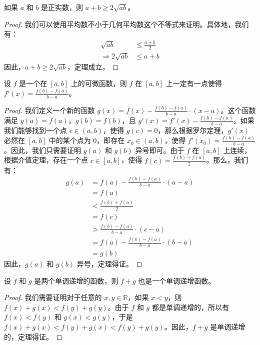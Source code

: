 \begin{cor}
  如果 $a$ 和 $b$ 是正实数，则 $a+b \geq 2\sqrt{ab}$。
\end{cor}

\begin{proof}
  我们可以使用平均数不小于几何平均数这个不等式来证明。具体地，我们有：
  \begin{align*}
    \sqrt{ab}              & \leq \frac{a+b}{2} \\
    \Rightarrow 2\sqrt{ab} & \leq a+b
  \end{align*}
  因此，$a+b \geq 2\sqrt{ab}$，定理成立。
\end{proof}

\begin{lem}
  设 $f$ 是一个在 $[a,b]$ 上的可微函数，则 $f$ 在 $[a,b]$ 上一定有一点使得 $f'(x) = \frac{f(b)-f(a)}{b-a}$。
\end{lem}

\begin{proof}
  我们定义一个新的函数 $g(x) = f(x) - \frac{f(b)-f(a)}{b-a} \cdot (x-a)$。这个函数满足 $g(a) = f(a)$，$g(b) = f(b)$，且 $g'(x) = f'(x) - \frac{f(b)-f(a)}{b-a}$。如果我们能够找到一个点 $c \in (a,b)$，使得 $g(c) = 0$，那么根据罗尔定理，$g'(x)$ 必然在 $[a,b]$ 中的某个点为 $0$，即存在 $x_0 \in (a,b)$，使得 $f'(x_0) = \frac{f(b)-f(a)}{b-a}$。因此，我们只需要证明 $g(a)$ 和 $g(b)$ 异号即可。由于 $f$ 在 $[a,b]$ 上连续，根据介值定理，存在一个点 $c \in [a,b]$，使得 $f(c) = \frac{f(b)+f(a)}{2}$。那么，我们有：
  \begin{align*}
    g(a) & = f(a) - \frac{f(b)-f(a)}{b-a} \cdot (a-a) \\
         & = f(a)                                     \\
         & < \frac{f(b)+f(a)}{2}                      \\
         & = f(c)                                     \\
         & > \frac{f(b)-f(a)}{b-a} \cdot (c-a)        \\
         & = f(a) - \frac{f(b)-f(a)}{b-a} \cdot (b-a) \\
         & = g(b)
  \end{align*}
  因此，$g(a)$ 和 $g(b)$ 异号，定理得证。
\end{proof}

\begin{prop}
  设 $f$ 和 $g$ 是两个单调递增的函数，则 $f+g$ 也是一个单调递增函数。
\end{prop}

\begin{proof}
  我们需要证明对于任意的 $x,y \in \mathbb{R}$，如果 $x < y$，则 $f(x)+g(x) < f(y)+g(y)$。由于 $f$ 和 $g$ 都是单调递增的，所以有 $f(x) < f(y)$ 和 $g(x) < g(y)$，于是 $f(x)+g(x) < f(y)+g(x) < f(y)+g(y)$。因此，$f+g$ 是单调递增的，定理得证。
\end{proof}

